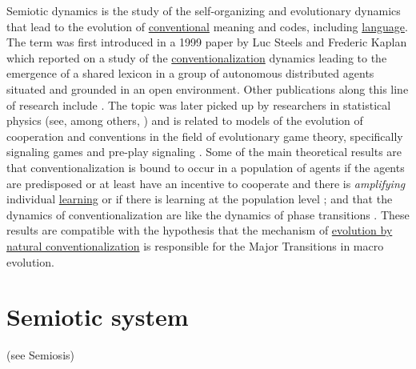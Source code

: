 \documentclass[12pt]{article}
\begin{document}
Semiotic dynamics is the study of the self-organizing and evolutionary
dynamics that lead to the evolution of
\hyperlink{convention}{conventional} meaning and codes, including
\hyperlink{language}{language}. The term was first introduced in a
1999 paper by Luc Steels and Frederic Kaplan \cite{steels99ecal} which
reported on a study of the
\hyperlink{conventionalization}{conventionalization} dynamics leading
to the emergence of a shared lexicon in a group of autonomous
distributed agents situated and grounded in an open environment. Other
publications along this line of research include
\cite{DeBeule06Cross_Situational_learning,vylder06namingGameConvergenceJTB,devylder07:phd,wellens08:_flexib_word_meanin_in_embod_agent}. The
topic was later picked up by researchers in statistical physics (see,
among others,
\cite{baronchelli05sharpTransitionVocabulary,cattuto07:_semiot_dynam_and_collab_taggin,puglisi08culturalRoutePNAS,loreto12})
and is related to models of the evolution of cooperation and
conventions in the field of evolutionary game theory, specifically
signaling games and pre-play signaling
\cite{skyrms10:_signal_evolut_learn_infor,santos11:_co}. Some of the
main theoretical results are that conventionalization is bound to
occur in a population of agents if the agents are predisposed or at
least have an incentive to cooperate and there is {\em amplifying}
individual \hyperlink{learning}{learning}
\cite{vylder06namingGameConvergenceJTB,skyrms10:_signal_evolut_learn_infor}
or if there is learning at the population level
\cite{santos11:_co,beule12:_overc_traged_commun_hawk_dove_conven_codin};
and that the dynamics of conventionalization are like the dynamics of
phase transitions \cite{baronchelli05sharpTransitionVocabulary}. These
results are compatible with the hypothesis that the mechanism of
\hyperlink{natural_conventionalization}{ evolution by natural
  conventionalization} is responsible for the Major Transitions in macro evolution.


\section{Semiotic system} (see Semiosis)
\end{document}
